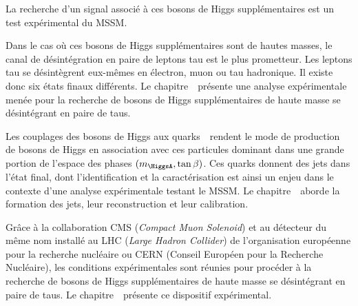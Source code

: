 La recherche d'un signal associé à ces bosons de Higgs supplémentaires est un test expérimental du MSSM.
\par Dans le cas où ces bosons de Higgs supplémentaires sont de hautes masses, le canal de désintégration en paire de leptons tau est le plus prometteur.
Les leptons tau se désintègrent eux-mêmes en électron, muon ou tau hadronique.
Il existe donc six états finaux différents.
Le chapitre~\ présente une analyse expérimentale menée pour la recherche de bosons de Higgs supplémentaires de haute masse se désintégrant en paire de taus.
\par Les couplages des bosons de Higgs aux quarks~\quarkb\ rendent le mode de production de bosons de Higgs en association avec ces particules dominant dans une grande portion de l'espace des phases $(m_{\HiggsA}, \tan\beta)$.
Ces quarks donnent des jets dans l'état final, dont l'identification et la caractérisation est ainsi un enjeu dans le contexte d'une analyse expérimentale testant le MSSM.
Le chapitre~\ aborde la formation des jets, leur reconstruction et leur calibration.
\par Grâce à la collaboration CMS (\emph{Compact Muon Solenoid}) et au détecteur du même nom installé au LHC (\emph{Large Hadron Collider}) de l'organisation européenne pour la recherche nucléaire ou CERN (Conseil Européen pour la Recherche Nucléaire), les conditions expérimentales sont réunies pour procéder à la
recherche de bosons de Higgs supplémentaires de haute masse se désintégrant en paire de taus.
Le chapitre~\ présente ce dispositif expérimental.